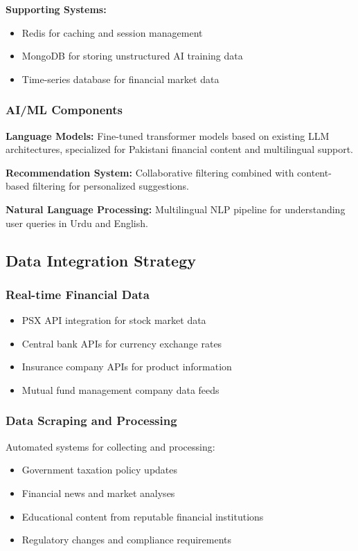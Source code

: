 \documentclass[conference]{IEEEtran}
\begin{document}
\textbf{Supporting Systems:}
\begin{itemize}
    \item Redis for caching and session management
    \item MongoDB for storing unstructured AI training data
    \item Time-series database for financial market data
\end{itemize}

\subsubsection{AI/ML Components}
\textbf{Language Models:} Fine-tuned transformer models based on existing LLM architectures, specialized for Pakistani financial content and multilingual support.

\textbf{Recommendation System:} Collaborative filtering combined with content-based filtering for personalized suggestions.

\textbf{Natural Language Processing:} Multilingual NLP pipeline for understanding user queries in Urdu and English.

\subsection{Data Integration Strategy}

\subsubsection{Real-time Financial Data}
\begin{itemize}
    \item PSX API integration for stock market data
    \item Central bank APIs for currency exchange rates
    \item Insurance company APIs for product information
    \item Mutual fund management company data feeds
\end{itemize}

\subsubsection{Data Scraping and Processing}
Automated systems for collecting and processing:
\begin{itemize}
    \item Government taxation policy updates
    \item Financial news and market analyses
    \item Educational content from reputable financial institutions
    \item Regulatory changes and compliance requirements
\end{itemize}
\end{document}
